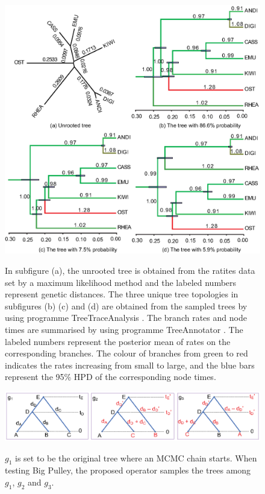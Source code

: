 \documentclass{bmcart}
\begin{document}
\begin{backmatter}
\begin{figure}[h!]
\includegraphics[width=12cm]{Fig17-fixedtree.eps}\\
\caption{
            In subfigure (a), the unrooted tree is obtained from the ratites data set \cite{cooper2001complete} by a maximum likelihood method \cite{phyml} and the labeled numbers represent genetic distances. The three unique tree topologies in subfigures (b) (c) and (d) are obtained from the sampled trees by using programme TreeTraceAnalysis \cite{TreeTraceAnalysis}. The branch rates and node times are summarised by using programme TreeAnnotator \cite{TreeAnnotator}. The labeled numbers represent the posterior mean of rates on the corresponding branches. The colour of branches from green to red indicates the rates increasing from small to large, and the blue bars represent the 95\% HPD of the corresponding node times.}
\label{withoutdata}
\end{figure}

\begin{figure}[h!]
\includegraphics[width=12cm]{Fig08-sampleprior.eps}\\
\caption{
             $g_1$ is set to be the original tree where an MCMC chain starts. When testing Big Pulley, the proposed operator samples the trees among $g_1$, $g_2$ and $g_3$.}
\label{sampleprior}
\end{figure}


\end{backmatter}
\end{document}
